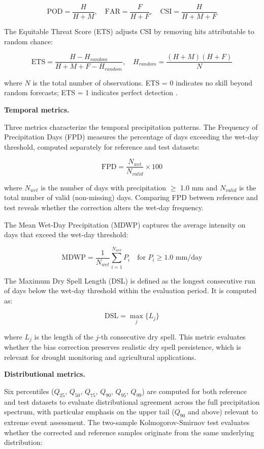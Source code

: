\documentclass[
]{article}
\begin{document}
\[\text{POD} = \frac{H}{H + M}, \quad \text{FAR} = \frac{F}{H + F}, \quad \text{CSI} = \frac{H}{H + M + F}\]

The Equitable Threat Score (ETS) adjusts CSI by removing hits
attributable to random chance:

\[\text{ETS} = \frac{H - H_{random}}{H + M + F - H_{random}}, \quad H_{random} = \frac{(H + M)(H + F)}{N}\]

where \(N\) is the total number of observations. ETS = 0 indicates no
skill beyond random forecasts; ETS = 1 indicates perfect detection
\cite{ref15}.

\textbf{Temporal metrics.}

Three metrics characterize the temporal precipitation patterns. The
Frequency of Precipitation Days (FPD) measures the percentage of days
exceeding the wet-day threshold, computed separately for reference and
test datasets:

\[\text{FPD} = \frac{N_{wet}}{N_{valid}} \times 100\]

where \(N_{wet}\) is the number of days with precipitation \(\geq\) 1.0
mm and \(N_{valid}\) is the total number of valid (non-missing) days.
Comparing FPD between reference and test reveals whether the correction
alters the wet-day frequency.

The Mean Wet-Day Precipitation (MDWP) captures the average intensity on
days that exceed the wet-day threshold:

\[\text{MDWP} = \frac{1}{N_{wet}} \sum_{i=1}^{N_{wet}} P_i \quad \text{for } P_i \geq 1.0 \text{ mm/day}\]

The Maximum Dry Spell Length (DSL) is defined as the longest consecutive
run of days below the wet-day threshold within the evaluation period. It
is computed as:

\[\text{DSL} = \max_{j} \{ L_j \}\]

where \(L_j\) is the length of the \(j\)-th consecutive dry spell. This
metric evaluates whether the bias correction preserves realistic dry
spell persistence, which is relevant for drought monitoring and
agricultural applications.

\textbf{Distributional metrics.}

Six percentiles (\(Q_{25}\), \(Q_{50}\), \(Q_{75}\), \(Q_{90}\),
\(Q_{95}\), \(Q_{99}\)) are computed for both reference and test
datasets to evaluate distributional agreement across the full
precipitation spectrum, with particular emphasis on the upper tail
(\(Q_{90}\) and above) relevant to extreme event assessment. The
two-sample Kolmogorov-Smirnov test evaluates whether the corrected and
reference samples originate from the same underlying distribution:
\end{document}
